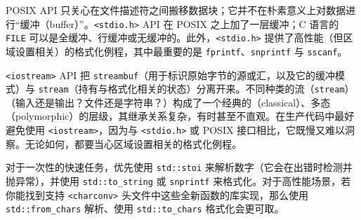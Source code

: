 POSIX API 只关心在文件描述符之间搬移数据块；它并不在朴素意义上对数据进行“缓冲（buffer）”。\texttt{<stdio.\allowbreak{}h>\allowbreak{}} API 在 POSIX 之上加了一层缓冲；C 语言的 \texttt{FILE} 可以是全缓冲、行缓冲或无缓冲的。此外，\texttt{<stdio.\allowbreak{}h>\allowbreak{}} 提供了高性能（但区域设置相关）的格式化例程，其中最重要的是 \texttt{fprintf}、\texttt{snprintf} 与 \texttt{sscanf}。

\texttt{<iostream>\allowbreak{}} API 把 \texttt{streambuf}（用于标识原始字节的源或汇，以及它的缓冲模式）与 \texttt{stream}（持有与格式化相关的状态）分离开来。不同种类的流（\texttt{stream}）（输入还是输出？文件还是字符串？）构成了一个经典的（classical）、多态（polymorphic）的层级，其继承关系复杂，有时甚至不直观。在生产代码中最好避免使用 \texttt{<iostream>\allowbreak{}}，因为与 \texttt{<stdio.\allowbreak{}h>\allowbreak{}} 或 POSIX 接口相比，它既慢又难以洞察。无论如何，都要当心区域设置相关的格式化例程。

对于一次性的快速任务，优先使用 \texttt{std::\allowbreak{}stoi} 来解析数字（它会在出错时检测并抛异常），并使用 \texttt{std::\allowbreak{}to\_\allowbreak{}string} 或 \texttt{snprintf} 来格式化。对于高性能场景，若你能找到支持 \texttt{<charconv>\allowbreak{}} 头文件中这些全新函数的库实现，那么使用 \texttt{std::\allowbreak{}from\_\allowbreak{}chars} 解析、使用 \texttt{std::\allowbreak{}to\_\allowbreak{}chars} 格式化会更可取。
